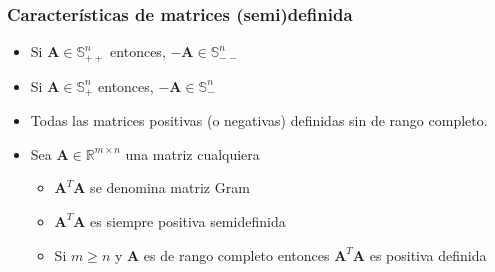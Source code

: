 \documentclass{beamer}
\begin{document}
\begin{frame}
\frametitle{Características de matrices (semi)definida}

\begin{itemize}
\item Si $ \boldsymbol{A} \in \mathbb{S}^{n}_{++}$ entonces, $ -\boldsymbol{A} \in  \mathbb{S}^{n}_{--}$ 
\item Si $ \boldsymbol{A} \in \mathbb{S}^{n}_{+}$ entonces, $ -\boldsymbol{A} \in  \mathbb{S}^{n}_{-}$ 
\item Todas las matrices positivas (o negativas) definidas sin de rango completo. 

\item Sea $\boldsymbol{A}\in \mathbb{R}^{m\times n}$ una matriz cualquiera 
\begin{itemize}
\item  $\boldsymbol{A}^{T} \boldsymbol{A}$ se denomina matriz Gram
\item  $\boldsymbol{A}^{T} \boldsymbol{A}$ es siempre positiva semidefinida
\item Si $m\geq n$ y $\boldsymbol{A}$ es de rango completo entonces $\boldsymbol{A}^{T} \boldsymbol{A}$ es positiva definida 
\end{itemize}
\end{itemize}

\end{frame}%
\end{document}
